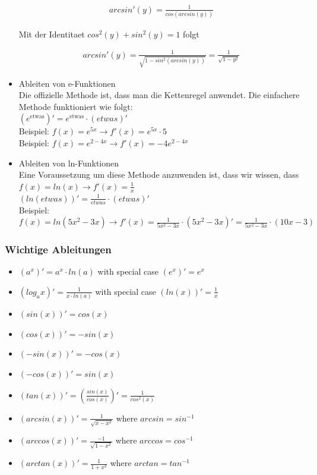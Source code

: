 \documentclass[a4paper]{article}
\begin{document}
\begin{itemize}
\begin{align*}
	arcsin'(y) = \frac{1}{cos(arcsin(y))}
\end{align*}

Mit der Identitaet $cos^2(y) + sin^2(y) = 1$ folgt

\begin{align*}
	arcsin'(y) = \frac{1}{\sqrt{1 - sin^2(arcsin(y))}} = \frac{1}{\sqrt{1 - y^2}}
\end{align*}
	
	\item Ableiten von e-Funktionen\\
	
	Die offizielle Methode ist, dass man die Kettenregel anwendet. Die einfachere Methode funktioniert wie folgt:\\
	
	$(e^{\text{etwas}})' = e^\text{etwas} \cdot (etwas)'$\\
	
	Beispiel: $f(x) = e^{5x} \rightarrow f'(x) = e^{5x} \cdot 5$\\
	Beispiel: $f(x) = e^{2 - 4x} \rightarrow f'(x) = -4e^{2 - 4x}$ 
	
	\item Ableiten von ln-Funktionen\\
	
	Eine Voraussetzung um diese Methode anzuwenden ist, dass wir wissen, dass $f(x) = ln(x) \rightarrow f'(x) = \frac{1}{x}$\\
	
	$(ln(etwas))' = \frac{1}{etwas} \cdot (etwas)'$\\
	
	Beispiel: $f(x) = ln(5x^2 - 3x) \rightarrow f'(x) = \frac{1}{5x^2 - 3x} \cdot (5x^2 - 3x)' = \frac{1}{5x^2 - 3x} \cdot (10x - 3)$
\end{itemize}



\subsubsection*{Wichtige Ableitungen}

\begin{itemize}
	\item $(a^x)' = a^x \cdot ln(a)$ with special case $(e^x)' = e^x$
	\item $(log_ax)' = \frac{1}{x \cdot ln(a)}$ with special case $(ln(x))' = \frac{1}{x}$
	\item $(sin(x))' = cos(x)$
	\item $(cos(x))' = -sin(x)$
	\item $(-sin(x))' = -cos(x)$
	\item $(-cos(x))' = sin(x)$
	\item $(tan(x))' = (\frac{sin(x)}{cos(x)})' = \frac{1}{cos^2(x)}$
	\item $(arcsin(x))' = \frac{1}{\sqrt{x - x^2}}$ where $arcsin = sin^{-1}$
	\item $(arccos(x))' = \frac{-1}{\sqrt{1 - x^2}}$ where $arccos = cos^{-1}$
	\item $(arctan(x))' = \frac{1}{1 + x^2}$ where $arctan = tan^{-1}$
\end{itemize}
\end{document}
